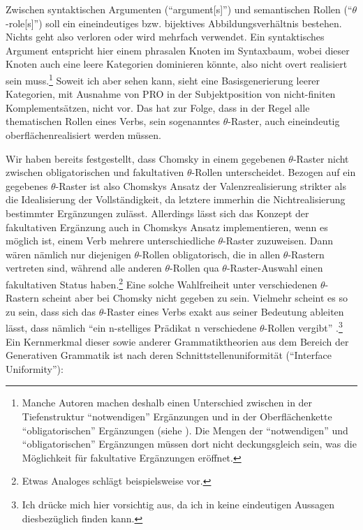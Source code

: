 Zwischen syntaktischen Argumenten ("`argument[s]"') und semantischen Rollen ("`$\theta$-role[s]"') soll ein eineindeutiges bzw. bijektives Abbildungsverhältnis bestehen. Nichts geht also verloren oder wird mehrfach verwendet. Ein syntaktisches Argument entspricht hier einem phrasalen Knoten im Syntaxbaum, wobei dieser Knoten auch eine leere Kategorien dominieren könnte, also nicht overt realisiert sein muss.\footnote{Manche Autoren machen deshalb einen Unterschied zwischen in der Tiefenstruktur "`notwendigen"' Ergänzungen und in der Oberflächenkette "`obligatorischen"' Ergänzungen (siehe \citealt[100]{Storrer:92}). Die Mengen der "`notwendigen"' und "`obligatorischen"' Ergänzungen müssen dort nicht deckungsgleich sein, was die Möglichkeit für fakultative Ergänzungen eröffnet.} Soweit ich aber sehen kann, sieht \cite{Chomsky:81} eine Basisgenerierung leerer Kategorien, mit Ausnahme von PRO in der Subjektposition von nicht-finiten Komplementsätzen, nicht vor. Das hat zur Folge, dass in der Regel alle thematischen Rollen eines Verbs, sein sogenanntes $\theta$-Raster, auch eineindeutig oberflächenrealisiert werden müssen.

Wir haben bereits festgestellt, dass Chomsky in einem gegebenen $\theta$-Raster nicht zwischen obligatorischen und fakultativen $\theta$-Rollen unterscheidet. Bezogen auf ein gegebenes $\theta$-Raster ist also Chomskys Ansatz der Valenzrealisierung strikter als die Idealisierung der Vollständigkeit, da letztere immerhin die Nichtrealisierung bestimmter Ergänzungen zulässt. Allerdings lässt sich das Konzept der fakultativen Ergänzung auch in Chomskys Ansatz implementieren, wenn es möglich ist, einem Verb mehrere unterschiedliche $\theta$-Raster zuzuweisen. Dann wären nämlich nur diejenigen $\theta$-Rollen obligatorisch, die in allen $\theta$-Rastern vertreten sind, während alle anderen $\theta$-Rollen qua $\theta$-Raster-Auswahl einen fakultativen Status haben.\footnote{Etwas Analoges schlägt beispielsweise \cite{Jacobs:94a} vor.} Eine solche Wahlfreiheit unter verschiedenen $\theta$-Rastern scheint aber bei Chomsky nicht gegeben zu sein. Vielmehr scheint es so zu sein, dass sich das $\theta$-Raster eines Verbs exakt aus seiner Bedeutung ableiten lässt, dass nämlich "`ein n-stelliges Prädikat n verschiedene $\theta$-Rollen vergibt"' \citep[258]{Stechow:Sternefeld:88}.\footnote{Ich drücke mich hier vorsichtig aus, da ich in \cite{Chomsky:81} keine eindeutigen Aussagen diesbezüglich finden kann.} Ein Kernmerkmal dieser sowie anderer Grammatiktheorien aus dem Bereich der Generativen Grammatik ist nach \cite{Culicover:Jackendoff:05} deren Schnittstellenuniformität ("`Interface Uniformity"'):

